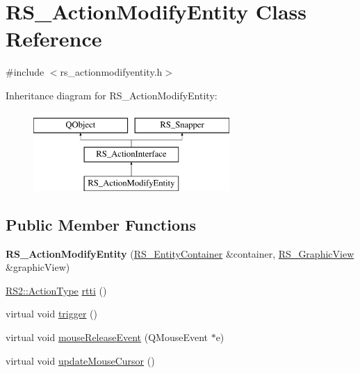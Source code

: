 \hypertarget{classRS__ActionModifyEntity}{\section{R\-S\-\_\-\-Action\-Modify\-Entity Class Reference}
\label{classRS__ActionModifyEntity}
}


{\ttfamily \#include $<$rs\-\_\-actionmodifyentity.\-h$>$}

Inheritance diagram for R\-S\-\_\-\-Action\-Modify\-Entity\-:\begin{figure}[H]
\begin{center}
\leavevmode
\includegraphics[height=3.000000cm]{classRS__ActionModifyEntity}
\end{center}
\end{figure}
\subsection*{Public Member Functions}
\begin{DoxyCompactItemize}
\item 
\hypertarget{classRS__ActionModifyEntity_a49a7152bae4306510cfcb2543f3a0f0e}{{\bfseries R\-S\-\_\-\-Action\-Modify\-Entity} (\hyperlink{classRS__EntityContainer}{R\-S\-\_\-\-Entity\-Container} \&container, \hyperlink{classRS__GraphicView}{R\-S\-\_\-\-Graphic\-View} \&graphic\-View)}\label{classRS__ActionModifyEntity_a49a7152bae4306510cfcb2543f3a0f0e}

\item 
\hyperlink{classRS2_afe3523e0bc41fd637b892321cfc4b9d7}{R\-S2\-::\-Action\-Type} \hyperlink{classRS__ActionModifyEntity_a83ab35137b63bf47a679bfb46059d504}{rtti} ()
\item 
virtual void \hyperlink{classRS__ActionModifyEntity_ae6fef66b49ddce3176748406ac584dea}{trigger} ()
\item 
virtual void \hyperlink{classRS__ActionModifyEntity_a408dab968f324f29db066785c7ed8c9a}{mouse\-Release\-Event} (Q\-Mouse\-Event $\ast$e)
\item 
virtual void \hyperlink{classRS__ActionModifyEntity_a2db8a78884e9a50f606ef898c9311b80}{update\-Mouse\-Cursor} ()
\end{DoxyCompactItemize}
